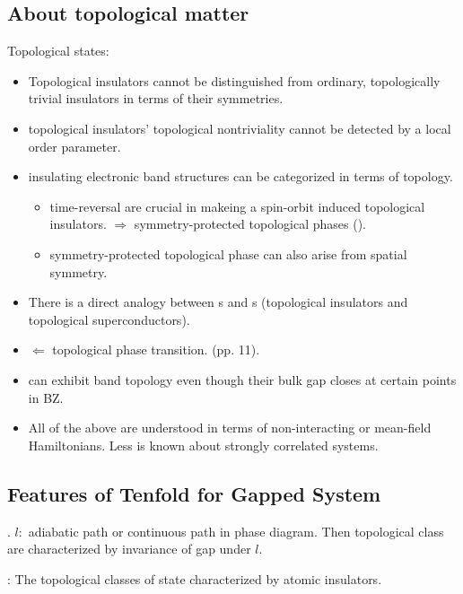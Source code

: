 \documentclass{article}
\begin{document}
\subsection{About topological matter}
\label{sec:About-topological-matter}
Topological states:
\begin{itemize}
    \item Topological insulators cannot be distinguished from
        ordinary, topologically trivial insulators in terms of their
        symmetries.
    \item topological insulators' topological nontriviality cannot be
        detected by a local order parameter.
    \item insulating electronic band structures can be categorized in
        terms of topology.
    \begin{itemize}
        \item time-reversal are crucial in makeing a spin-orbit induced
            topological insulators. $ \Rightarrow$ symmetry-protected
            topological phases ().
        \item symmetry-protected topological phase can also arise from
            spatial symmetry.
    \end{itemize}
    \item There is a direct analogy between s and
        s (topological insulators and topological
        superconductors).
    \item {} $ \Leftarrow$
        topological phase transition. (pp. 11).
    \item {} can exhibit band topology even though
        their bulk gap closes at certain points in BZ.
    \item All of the above are understood in terms of non-interacting
        or mean-field Hamiltonians. Less is known about strongly
        correlated systems.
\end{itemize}

\subsection{Features of Tenfold for Gapped System}
\label{sec:Tenfold-for-Gapped-System}
. $l:$ adiabatic path or continuous path in
phase diagram. Then topological class are characterized by invariance
of gap under $l$.

: The topological classes of state
characterized by atomic insulators.
\end{document}
